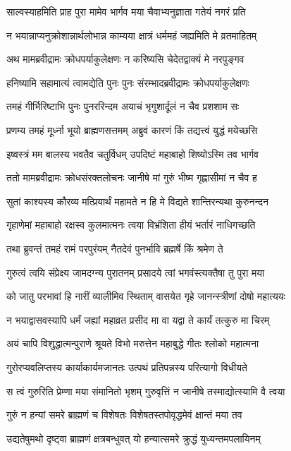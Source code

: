 \twolineshloka
{साल्वस्याहमिति प्राह पुरा मामेव भार्गव}
{मया चैवाभ्यनुज्ञाता गतेयं नगरं प्रति}


\twolineshloka
{न भयान्नाप्यनुक्रोशान्नार्थलोभान्न काम्यया}
{क्षात्रं धर्ममहं जह्यमिति मे व्रतमाहितम्}


\twolineshloka
{अथ मामब्रवीद्रामः क्रोधपर्याकुलेक्षणः}
{न करिष्यसि चेदेतद्वाक्यं मे नरपुङ्गव}


\twolineshloka
{हनिष्यामि सहामात्यं त्वामद्येति पुनः पुनः}
{संरम्भादब्रवीद्रामः क्रोधपर्याकुलेक्षणः}


\twolineshloka
{तमहं गीर्भिरिष्टाभि पुनः पुनररिन्दम}
{अयाचं भृगुशार्दूलं न चैव प्रशशाम सः}


\twolineshloka
{प्रणम्य तमहं मूर्ध्ना भूयो ब्राह्मणसत्तमम्}
{अब्रुवं कारणं किं तद्यत्त्वं युद्धं मयेच्छसि}


\twolineshloka
{इष्वस्त्रं मम बालस्य भवतैव चतुर्विधम्}
{उपदिष्टं महाबाहो शिष्योऽस्मि तव भार्गव}


\twolineshloka
{ततो मामब्रवीद्रामः क्रोधसंरक्तलोचनः}
{जानीषे मां गुरुं भीष्म गृह्णासीमां न चैव ह}


\twolineshloka
{सुतां काश्यस्य कौरव्य मत्प्रियार्थं महामते}
{न हि मे विद्यते शान्तिरन्यथा कुरुनन्दन}


\twolineshloka
{गृहाणेमां महाबाहो रक्षस्व कुलमात्मनः}
{त्वया विभ्रंशिता हीयं भर्तारं नाधिगच्छति}


\twolineshloka
{तथा ब्रुवन्तं तमहं रामं परपुरंयम्}
{नैतदेवं पुनर्भावि ब्रह्मर्षे किं श्रमेण ते}


\twolineshloka
{गुरुत्वं त्वयि संप्रेक्ष्य जामदग्न्य पुरातनम्}
{प्रसादये त्वां भगवंस्त्यक्तैषा तु पुरा मया}


\twolineshloka
{को जातु परभावां हि नारीं व्यालीमिव स्थिताम्}
{वासयेत गृहे जानन्स्त्रीणां दोषो महात्ययः}


\twolineshloka
{न भयाद्वासवस्यापि धर्मं जह्यां महाव्रत}
{प्रसीद मा वा यद्वा ते कार्यं तत्कुरु मा चिरम्}


\twolineshloka
{अयं चापि विशुद्धात्मन्पुराणे श्रूयते विभो}
{मरुत्तेन महाबुद्धे गीतः श्लोको महात्मना}


\twolineshloka
{गुरोरप्यवलिप्तस्य कार्याकार्यमजानतः}
{उत्पथं प्रतिपन्नस्य परित्यागो विधीयते}


\twolineshloka
{स त्वं गुरुरिति प्रेम्णा मया संमानितो भृशम्}
{गुरुवृत्तिं न जानीषे तस्माद्योत्स्यामि वै त्वया}


\twolineshloka
{गुरुं न हन्यां समरे ब्राह्मणं च विशेषतः}
{विशेषतस्तपोवृद्धमेवं क्षान्तं मया तव}


\twolineshloka
{उद्यतेषुमथो दृष्ट्वा ब्राह्मणं क्षत्रबन्धुवत्}
{यो हन्यात्समरे क्रुद्धं युध्यन्तमपलायिनम्}


